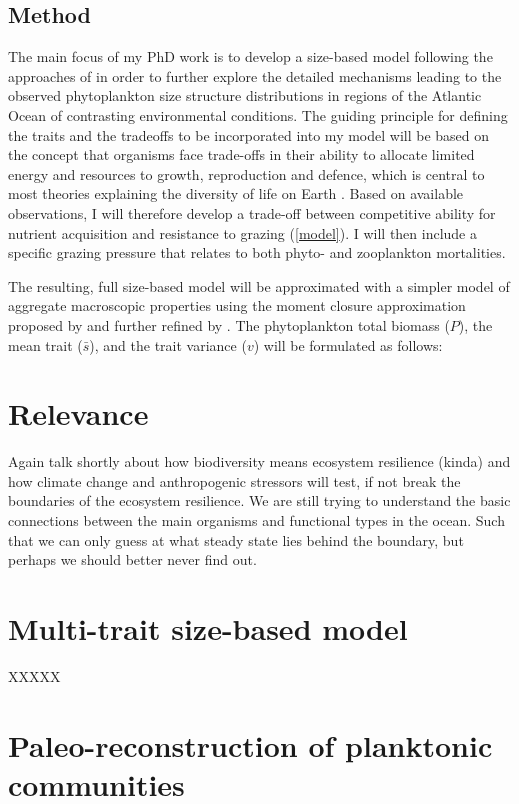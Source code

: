 \subsection{Method}
The main focus of my PhD work is to develop a size-based model following the approaches of  \citet{Bruggeman2007, Merico2009} in order to further explore the detailed mechanisms leading to the observed phytoplankton size structure distributions in regions of the Atlantic Ocean of contrasting environmental conditions. The guiding principle for defining the traits and the tradeoffs to be incorporated into my model will be based on the concept that organisms face trade-offs in their ability to allocate limited energy and resources to growth, reproduction and defence, which is central to most theories explaining the diversity of life on Earth \citep{Tilman2000}. Based on available observations, I will therefore develop a trade-off between competitive ability for nutrient acquisition and resistance to grazing (\ref{model}). I will then include a specific grazing pressure that relates to both phyto- and zooplankton mortalities.

The resulting, full size-based model will be approximated with a simpler model of aggregate macroscopic properties using the moment closure approximation proposed by \citet{Wirtz1996, Norberg2001} and further refined by \citet{Bruggeman2007, Merico2009}. The phytoplankton total biomass ($P$), the mean trait ($\bar{s}$), and the trait variance ($v$) will be formulated as follows:

\section{Relevance}
Again talk shortly about how biodiversity means ecosystem resilience (kinda) and how climate change and anthropogenic stressors will test, if not break the boundaries of the ecosystem resilience. We are still trying to understand the basic connections between the main organisms and functional types in the ocean. Such that we can only guess at what steady state lies behind the boundary, but perhaps we should better never find out.

\section{Multi-trait size-based model}
XXXXX

\section{Paleo-reconstruction of planktonic communities}


